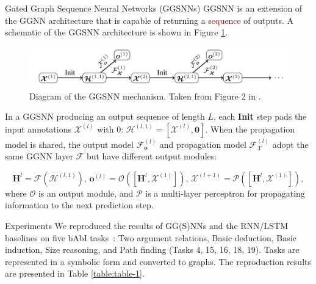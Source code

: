 \documentclass[final,hyperref={pdfpagelabels=false}]{beamer}
\begin{document}
\begin{frame}[t]
\begin{columns}[t]
\begin{column}{.3\textwidth}
    \color{oxfordblue}
    
    
    \begin{block}{Gated Graph Sequence Neural Networks (GGSNNs)}
     GGSNN is an extension of the GGNN architecture that is capable of returning a \textcolor{darkred}{sequence} of outputs. A schematic of the GGSNN architecture is shown in Figure \ref{fig:GGSNN}.

    \begin{figure}
        \centering
        \includegraphics[width=\textwidth]{imgs/ggsnn.png}
        \caption{Diagram of the GGSNN mechanism. Taken from Figure 2 in \cite{DBLP:journals/corr/LiTBZ15}.}
        \label{fig:GGSNN}
    \end{figure}
    In a GGSNN 
    producing an output sequence of length $L$, each \textbf{Init} step pads the input annotations $\boldsymbol{\mathcal{X}}^{(l)}$ with 0: $\boldsymbol{\mathcal{H}}^{(l, 1)} = [\boldsymbol{\mathcal{X}}^{(l)}, \boldsymbol{0}]$.
    When the propagation model is shared, the output model $\mathcal{F}_{\mathbf o}^{(l)}$ and propagation model $\mathcal{F}_{\boldsymbol{\mathcal{X}}}^{(l)}$ adopt the same GGNN layer $\mathcal{F}$ but have different output modules:
    
    \begin{equation}
        \mathbf{H}^l = \boldsymbol{\mathcal{F}}\left(\boldsymbol{\mathcal{H}}^{(l, 1)}\right),\, \boldsymbol{o}^{(l)} = 
        \boldsymbol{\mathcal{O}} \left([\mathbf{H}^l, \boldsymbol{\mathcal{X}}^{(1)}]\right),\, 
        \boldsymbol{\mathcal{X}}^{(l+1)} = \boldsymbol{\mathcal{P}}\left([\mathbf{H}^l, \boldsymbol{\mathcal{X}}^{(1)}]\right),
    \end{equation}
    where $\boldsymbol{\mathcal{O}}$ is an output module, and $\boldsymbol{\mathcal{P}}$ is a multi-layer perceptron for propagating information to the next prediction step.
    \end{block}
    \vspace{-0.6in} 
    \begin{block}{Experiments}
      We reproduced the results of GG(S)NNs and the RNN/LSTM baselines on five bAbI tasks~\cite{DBLP:journals/corr/WestonBCM15}: Two argument relations, Basic deduction, Basic induction, Size reasoning, and Path finding (Tasks 4, 15, 16, 18, 19). Tasks are represented in a symbolic form and converted to graphs. The reproduction results are presented in Table \ref{table:table-1}.\vspace{0.1in}
      

\end{block}
\end{column}
\end{columns}
\end{frame}
\end{document}

